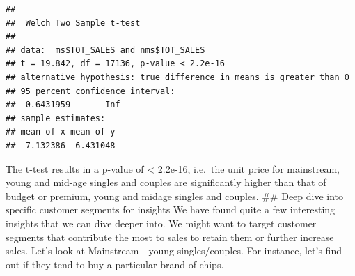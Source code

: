 \documentclass[
]{article}
\newenvironment{Shaded}{\begin{snugshade}}{\end{snugshade}}
\newcommand{\AttributeTok}[1]{\textcolor[rgb]{0.13,0.29,0.53}{#1}}
\newcommand{\CommentTok}[1]{\textcolor[rgb]{0.56,0.35,0.01}{\textit{#1}}}
\newcommand{\FloatTok}[1]{\textcolor[rgb]{0.00,0.00,0.81}{#1}}
\newcommand{\FunctionTok}[1]{\textcolor[rgb]{0.13,0.29,0.53}{\textbf{#1}}}
\newcommand{\NormalTok}[1]{#1}
\newcommand{\SpecialCharTok}[1]{\textcolor[rgb]{0.81,0.36,0.00}{\textbf{#1}}}
\newcommand{\StringTok}[1]{\textcolor[rgb]{0.31,0.60,0.02}{#1}}
\begin{document}
\begin{Shaded}
\end{Shaded}

\begin{verbatim}
## 
##  Welch Two Sample t-test
## 
## data:  ms$TOT_SALES and nms$TOT_SALES
## t = 19.842, df = 17136, p-value < 2.2e-16
## alternative hypothesis: true difference in means is greater than 0
## 95 percent confidence interval:
##  0.6431959       Inf
## sample estimates:
## mean of x mean of y 
##  7.132386  6.431048
\end{verbatim}

The t-test results in a p-value of \textless{} 2.2e-16, i.e.~the unit
price for mainstream, young and mid-age singles and couples are
significantly higher than that of budget or premium, young and midage
singles and couples. \#\# Deep dive into specific customer segments for
insights We have found quite a few interesting insights that we can dive
deeper into. We might want to target customer segments that contribute
the most to sales to retain them or further increase sales. Let's look
at Mainstream - young singles/couples. For instance, let's find out if
they tend to buy a particular brand of chips.
\end{document}
